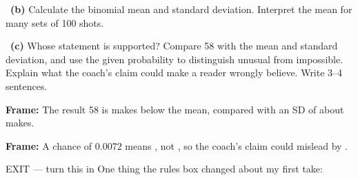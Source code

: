\documentclass[11pt]{article}
\begin{document}
~\textbf{(b)} Calculate the binomial mean and standard deviation. Interpret the mean for many sets of 100 shots.\par
\workspace{1.3in}

~\textbf{(c)} Whose statement is supported? Compare 58 with the mean and standard deviation, and use the given probability to distinguish unusual from impossible. Explain what the coach's claim could make a reader wrongly believe. Write 3--4 sentences.\par
\workspace{2.0in}

\begin{sentenceframebox}\raggedright\textbf{Frame:} The result 58 is \blank[0.6in] makes below the mean, compared with an SD of about \blank[0.6in] makes.\end{sentenceframebox}

\begin{sentenceframebox}\raggedright\textbf{Frame:} A chance of $0.0072$ means \blank[1.5in], not \blank[1.0in], so the coach's claim could mislead by \blank[1.8in].\end{sentenceframebox}

\begin{summaryexitbox}{EXIT --- turn this in}
One thing the rules box changed about my first take: \hrulefill\par
\workspace{0.4in}
\end{summaryexitbox}
\end{document}
